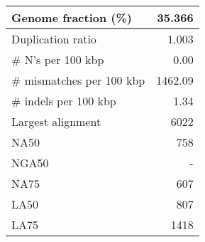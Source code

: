 \documentclass[12pt,a4paper]{article}
\begin{document}
\begin{table}[ht]
\begin{center}
\begin{tabular}{|l*{1}{|r}|}
Genome fraction (\%) & 35.366 \\ \hline
Duplication ratio & 1.003 \\ \hline
\# N's per 100 kbp & 0.00 \\ \hline
\# mismatches per 100 kbp & 1462.09 \\ \hline
\# indels per 100 kbp & 1.34 \\ \hline
Largest alignment & 6022 \\ \hline
NA50 & 758 \\ \hline
NGA50 & - \\ \hline
NA75 & 607 \\ \hline
LA50 & 807 \\ \hline
LA75 & 1418 \\ \hline
\end{tabular}
\end{center}
\end{table}
\end{document}
